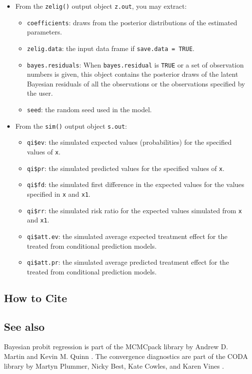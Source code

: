 \begin{itemize}
\item From the \texttt{zelig()} output object \texttt{z.out}, you may extract:

\begin{itemize}
\item \texttt{coefficients}: draws from the posterior distributions
of the estimated parameters. 

   \item {\tt zelig.data}: the input data frame if {\tt save.data = TRUE}.  

\item \texttt{bayes.residuals}: When \texttt{bayes.residual} is \texttt{TRUE}
or a set of observation numbers is given, this object contains the 
posterior draws of the latent Bayesian residuals of all the observations 
or the observations specified by the user. 

\item \texttt{seed}: the random seed used in the model.

\end{itemize}

\item From the \texttt{sim()} output object \texttt{s.out}:

\begin{itemize}
\item \texttt{qi\$ev}: the simulated expected values (probabilities) for the specified
values of \texttt{x}.

\item \texttt{qi\$pr}: the simulated predicted values for the specified values
of \texttt{x}.

\item \texttt{qi\$fd}: the simulated first difference in the expected
values for the values specified in \texttt{x} and \texttt{x1}.

\item \texttt{qi\$rr}: the simulated risk ratio for the expected values
simulated from \texttt{x} and \texttt{x1}.

\item \texttt{qi\$att.ev}: the simulated average expected treatment effect
for the treated from conditional prediction models.

\item \texttt{qi\$att.pr}: the simulated average predicted treatment effect
for the treated from conditional prediction models.
\end{itemize}
\end{itemize}

\subsection* {How to Cite} 



\subsection*{See also}
Bayesian probit regression is part of the MCMCpack library by Andrew D. Martin and Kevin M. Quinn \citep{MarQui05}. The convergence diagnostics are part of the CODA library by Martyn Plummer, Nicky Best, Kate Cowles, and Karen Vines \citep{PluBesCowVin05}.
